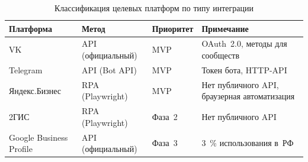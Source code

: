 \begin{table}[H]
  \caption{Классификация целевых платформ по типу интеграции}
  \label{tab:platform-class}
  \small
  \begin{tabularx}{\textwidth}{|p{3.5cm}|p{2.5cm}|p{2cm}|X|}
    \hline
    \textbf{Платформа} & \textbf{Метод} & \textbf{Приоритет} & \textbf{Примечание} \\
    \hline
    VK & API (официальный) & MVP & OAuth~2.0, методы для сообществ \\
    \hline
    Telegram & API (Bot API) & MVP & Токен бота, HTTP-API \\
    \hline
    Яндекс.Бизнес & RPA (Playwright) & MVP & Нет публичного API, браузерная автоматизация \\
    \hline
    2ГИС & RPA (Playwright) & Фаза~2 & Нет публичного API \\
    \hline
    Google Business Profile & API (официальный) & Фаза~3 & 3~\% использования в~РФ \\
    \hline
  \end{tabularx}
\end{table}
